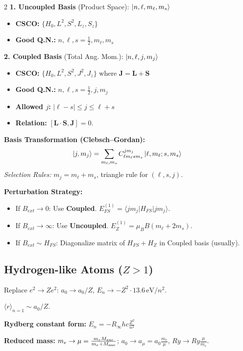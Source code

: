 \documentclass[9pt,a4paper]{article} %
\begin{document}
\begin{multicols}{2}
\textbf{1. Uncoupled Basis} (Product Space): $\ket{n,\ell, m_\ell, m_s}$
\begin{itemize} \itemsep0em
    \item \textbf{CSCO:} $\{H_0, L^2, S^2, L_z, S_z\}$
    \item \textbf{Good Q.N.:} $n,\ell, s=\tfrac{1}{2}, m_\ell, m_s$
\end{itemize}

\textbf{2. Coupled Basis} (Total Ang. Mom.): $\ket{n,\ell, j, m_j}$
\begin{itemize} \itemsep0em
    \item \textbf{CSCO:} $\{H_0, L^2, S^2, J^2, J_z\}$ where $\mathbf{J} = \mathbf{L} + \mathbf{S}$
    \item \textbf{Good Q.N.:} $n,\ell, s=\tfrac{1}{2}, j, m_j$
    \item \textbf{Allowed $j$:} $|\ell-s| \leq j \leq \ell+s$
    \item \textbf{Relation:} $[\mathbf{L}\cdot\mathbf{S}, \mathbf{J}] = 0$.
\end{itemize}

\textbf{Basis Transformation (Clebsch--Gordan):}
\[ \ket{j, m_j} = \sum_{m_\ell, m_s} C^{j m_j}_{\ell m_\ell s m_s} \ket{\ell, m_\ell; s, m_s} \]
\textit{Selection Rules:} $m_j = m_\ell + m_s$, triangle rule for $(\ell,s,j)$. 

\textbf{Perturbation Strategy:}
\begin{itemize} \itemsep0em
    \item If $B_{ext} \to 0$: Use \textbf{Coupled}. $E_{FS}^{(1)} = \langle j m_j | H_{FS} | j m_j \rangle$.
    \item If $B_{ext} \to \infty$: Use \textbf{Uncoupled}. $E_{Z}^{(1)} = \mu_B B (m_\ell + 2m_s)$.
    \item If $B_{ext} \sim H_{FS}$: Diagonalize matrix of $H_{FS} + H_Z$ in Coupled basis (usually).
\end{itemize}

\subsection{Hydrogen-like Atoms ($Z>1$)}
Replace $e^2\to Ze^2$:\; $a_0\to a_0/Z$, $E_n\to -Z^2\cdot13.6\,\text{eV}/n^2$.

$\langle r\rangle_{n=1}\sim a_0/Z$.

\textbf{Rydberg constant form:}
$E_n=-R_\infty h c \frac{Z^2}{n^2}$

\textbf{Reduced mass:} $m_e\to\mu=\frac{m_e M_{\rm nuc}}{m_e+M_{\rm nuc}}$; $a_0\to a_\mu=a_0\frac{m_e}{\mu}$, $Ry\to Ry\frac{\mu}{m_e}$.


\end{multicols}
\end{document}
